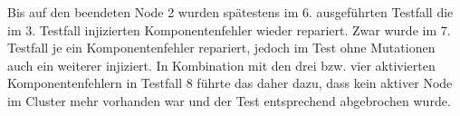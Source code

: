 Bis auf den beendeten Node 2 wurden spätestens im 6. ausgeführten Testfall die im 3. Testfall injizierten Komponentenfehler wieder repariert.
Zwar wurde im 7. Testfall je ein Komponentenfehler repariert, jedoch im Test ohne Mutationen auch ein weiterer injiziert.
In Kombination mit den drei bzw. vier aktivierten Komponentenfehlern in Testfall 8 führte das daher dazu, dass kein aktiver Node im Cluster mehr vorhanden war und der Test entsprechend abgebrochen wurde.
